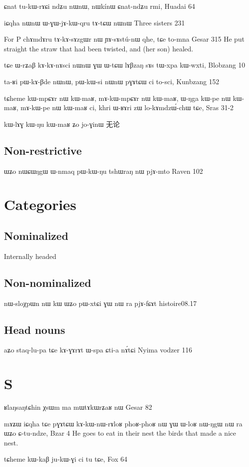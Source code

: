 \documentclass[oldfontcommands,oneside,a4paper,11pt]{memoir}
\begin{document}
 
 ɕnat	tu-kɯ-rɤɕi	ndʑu	nɯnɯ,	nɯkínɯ	ɕnat-ndʑu	rmi,
 Huadai 64
 
 iɕqha	nɯnɯ	ɯ-ɣɯ-jɤ-kɯ-qru	tɤ-tɕɯ	nɯnɯ
Three sisters 231

For P
chɤmdɤru	tɤ-kɤ-sɤzgɯr nɯ	ɲɤ-sɤstú-nɯ	qhe,	tɕe	to-mna
Gesar 	315
He put straight the straw that had been twisted, and (her son) healed.

tɕe ɯ-rʑaβ kɤ-kɤ-nɤsci nɯnɯ ɣɯ ɯ-tɕɯ lɤβzaŋ sɤs tɯ-xpa kɯ-wxti,
Blobzang 10

ta-ʁi	pɯ-kɤ-βde	nɯnɯ,	pɯ-kɯ-si	nɯnɯ	pɣɤtɕɯ	ci	to-sci,
Kunbzang 152

 tɕheme	kɯ-mpɕɤr	nɯ	kɯ-maʁ,	mɤ-kɯ-mpɕɤr	nɯ	kɯ-maʁ,	ɯ-ŋga	kɯ-pe	nɯ	kɯ-maʁ,	mɤ-kɯ-pe	nɯ	kɯ-maʁ	ci,	khri	ɯ-ʁɤri	zɯ	lo-kɤmdzɯ́-chɯ	tɕe,
Sras 31-2


kɯ-lɤɣ kɯ-ŋu kɯ-maʁ ʑo jo-ɣinɯ
无论
\subsection{Non-restrictive}
ɯʑo	nɯɕɯŋgɯ ɯ-nmaq		pɯ-kɯ-ŋu	tshɯraŋ	nɯ	pjɤ-mto
Raven 102

\section{Categories}
\subsection{Nominalized}
Internally headed
\subsection{Non-nominalized} \label{sub:relative.non.nmlz}
nɯ-sloχpɯn nɯ kɯ ɯʑo pɯ-xtɕi ɣɯ nɯ ra pjɤ-fɕɤt
histoire08.17

\subsection{Head nouns}
aʑo	staq-lu-pa	tɕe	kɤ-ɣɤrɤt	ɯ-spa	ɕti-a	nɤ́tɕi
Nyima vodzer 116

\section{S}
ʁlaŋsaŋtɕhin χsɯm ma mɯtɤkɯrʑaʁ nɯ
Gesar 82

mɤʑɯ	iɕqha	tɕe	pɣɤtɕɯ	kɤ-kɯ-nɯ-rɤloʁ	phoʁ-phoʁ	nɯ	ɣɯ	ɯ-loʁ	nɯ-ŋgɯ	nɯ	ra	ɯʑo	ɕ-tu-ndze,
Bzar 4
He goes to eat in their nest the birds that made a nice nest.

tɕheme	kɯ-kaβ	ju-kɯ-ɣi	ci	tu	tɕe,
Fox 64
\end{document}
